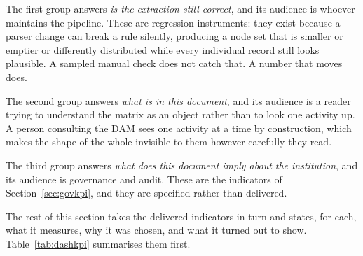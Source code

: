 The first group answers \emph{is the extraction still correct}, and its audience is whoever
maintains the pipeline. These are regression instruments: they exist because a parser change
can break a rule silently, producing a node set that is smaller or emptier or differently
distributed while every individual record still looks plausible. A sampled manual check does
not catch that. A number that moves does.

The second group answers \emph{what is in this document}, and its audience is a reader
trying to understand the matrix as an object rather than to look one activity up. A person
consulting the DAM sees one activity at a time by construction, which makes the shape of the
whole invisible to them however carefully they read.

The third group answers \emph{what does this document imply about the institution}, and its
audience is governance and audit. These are the indicators of Section~\ref{sec:govkpi}, and
they are specified rather than delivered.

The rest of this section takes the delivered indicators in turn and states, for each, what it
measures, why it was chosen, and what it turned out to show. Table~\ref{tab:dashkpi}
summarises them first.

